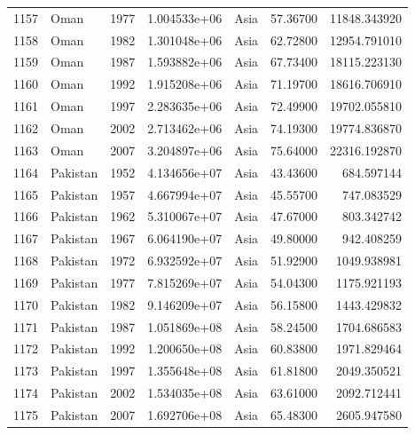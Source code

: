 \documentclass[
  letterpaper,
  DIV=11,
  numbers=noendperiod]{scrreprt}
\begin{document}
\begin{tabular}{llrrlrr}
1157 &                      Oman &  1977 &  1.004533e+06 &      Asia &  57.36700 &   11848.343920 \\
1158 &                      Oman &  1982 &  1.301048e+06 &      Asia &  62.72800 &   12954.791010 \\
1159 &                      Oman &  1987 &  1.593882e+06 &      Asia &  67.73400 &   18115.223130 \\
1160 &                      Oman &  1992 &  1.915208e+06 &      Asia &  71.19700 &   18616.706910 \\
1161 &                      Oman &  1997 &  2.283635e+06 &      Asia &  72.49900 &   19702.055810 \\
1162 &                      Oman &  2002 &  2.713462e+06 &      Asia &  74.19300 &   19774.836870 \\
1163 &                      Oman &  2007 &  3.204897e+06 &      Asia &  75.64000 &   22316.192870 \\
1164 &                  Pakistan &  1952 &  4.134656e+07 &      Asia &  43.43600 &     684.597144 \\
1165 &                  Pakistan &  1957 &  4.667994e+07 &      Asia &  45.55700 &     747.083529 \\
1166 &                  Pakistan &  1962 &  5.310067e+07 &      Asia &  47.67000 &     803.342742 \\
1167 &                  Pakistan &  1967 &  6.064190e+07 &      Asia &  49.80000 &     942.408259 \\
1168 &                  Pakistan &  1972 &  6.932592e+07 &      Asia &  51.92900 &    1049.938981 \\
1169 &                  Pakistan &  1977 &  7.815269e+07 &      Asia &  54.04300 &    1175.921193 \\
1170 &                  Pakistan &  1982 &  9.146209e+07 &      Asia &  56.15800 &    1443.429832 \\
1171 &                  Pakistan &  1987 &  1.051869e+08 &      Asia &  58.24500 &    1704.686583 \\
1172 &                  Pakistan &  1992 &  1.200650e+08 &      Asia &  60.83800 &    1971.829464 \\
1173 &                  Pakistan &  1997 &  1.355648e+08 &      Asia &  61.81800 &    2049.350521 \\
1174 &                  Pakistan &  2002 &  1.534035e+08 &      Asia &  63.61000 &    2092.712441 \\
1175 &                  Pakistan &  2007 &  1.692706e+08 &      Asia &  65.48300 &    2605.947580 \\

\end{tabular}
\end{document}
